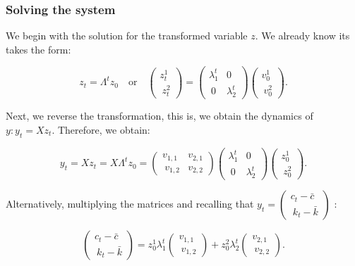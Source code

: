 \documentclass[11pt,a4paper,english]{article}
\begin{document}
\hypertarget{solving-the-system}{%
\subsubsection{Solving the system}\label{solving-the-system}}

We begin with the solution for the transformed variable \(z.\) We
already know its takes the form:

\[z_{t} = \Lambda^{t} z_{0} \quad \mathrm{or} \quad \begin{pmatrix} z_{t}^{1} \\\ z_{t}^{2} \end{pmatrix} = \begin{pmatrix} \lambda_{1}^{t} & 0 \\\ 0 & \lambda_{2}^{t} \end{pmatrix} \begin{pmatrix} v_{0}^{1} \\\ v_{0}^{2} \end{pmatrix}.\]

Next, we reverse the transformation, this is, we obtain the dynamics of
\(y: y_{t} = X z_{t}.\) Therefore, we obtain:

\[y_{t} = X z_{t} = X \Lambda^{t} z_{0} = \begin{pmatrix} v_{1,1} & v_{2,1} \\\ v_{1,2} & v_{2,2} \end{pmatrix} \begin{pmatrix} \lambda_{1}^{t} & 0 \\\ 0 & \lambda_{2}^{t} \end{pmatrix} \begin{pmatrix} z_{0}^{1} \\\ z_{0}^{2} \end{pmatrix}.\]

Alternatively, multiplying the matrices and recalling that
\(y_{t}=\begin{pmatrix} c_{t} - \bar{c} \\\ k_{t} - \bar{k} \end{pmatrix}\)
:

\[\begin{pmatrix} c_{t} - \bar{c} \\\ k_{t} - \bar{k} \end{pmatrix} = z_{0}^{1} \lambda_{1}^{t} \begin{pmatrix} v_{1,1} \\\ v_{1,2} \end{pmatrix} + z_{0}^{2} \lambda_{2}^{t} \begin{pmatrix} v_{2,1} \\\ v_{2,2} \end{pmatrix}.\]
\end{document}
